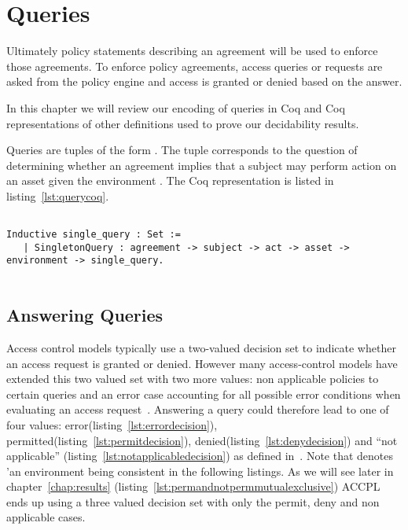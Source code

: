 \section{Queries}

Ultimately policy statements describing an agreement will be used to enforce those agreements. To enforce policy agreements, access queries or requests are asked from the policy engine and access is granted or denied based on the answer.

In this chapter we will review our encoding of queries in Coq and Coq representations of other definitions used to prove our decidability results.

Queries are tuples of the form . The tuple corresponds to the question of determining whether an agreement implies that a subject  may perform action  on an asset  given the environment . The Coq representation is listed in listing~\ref{lst:querycoq}. 

\begin{minipage}[c]{0.95\textwidth}
\begin{lstlisting}

Inductive single_query : Set := 
   | SingletonQuery : agreement -> subject -> act -> asset -> environment -> single_query.
   
\end{lstlisting}
\end{minipage}

\subsection{Answering Queries}\label{subsec:answerqueriesodrl}

Access control models typically use a two-valued decision set to indicate whether an access request is granted or denied. However many access-control models have extended this two valued set with two more values: non applicable policies to certain queries and an error case accounting for all possible error conditions when evaluating an access request~\cite{DBLP:conf/sacmat/MorissetZ14}. Answering a query could therefore lead to one of four values: error(listing~\ref{lst:errordecision}), permitted(listing~\ref{lst:permitdecision}), denied(listing~\ref{lst:denydecision}) and ``not applicable'' (listing~\ref{lst:notapplicabledecision}) as defined in~\cite{Tschantz}. Note that  denotes 'an environment being consistent in the following listings. As we will see later in chapter~\ref{chap:results} (listing~\ref{lst:permandnotpermmutualexclusive}) \ac{ACCPL} ends up using a three valued decision set with only the permit, deny and non applicable cases. 

